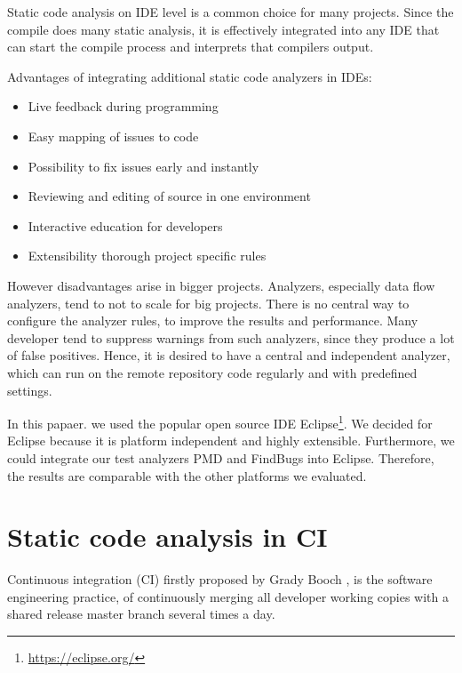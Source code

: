 \documentclass[conference]{IEEEtran}
\begin{document}
Static code analysis on IDE level is a common choice for many projects. Since the compile does many static analysis, it is effectively integrated into any IDE that can start the compile process and interprets that compilers output.

Advantages of integrating additional static code analyzers in IDEs:
\begin{itemize}
	\item Live feedback during programming
	\item Easy mapping of issues to code
	\item Possibility to fix issues early and instantly
	\item Reviewing and editing of source in one environment
	\item Interactive education for developers
	\item Extensibility thorough project specific rules
\end{itemize}

However disadvantages arise in bigger projects. Analyzers, especially data flow analyzers, tend to not to scale for big projects. 
There is no central way to configure the analyzer rules, to improve the results and performance.
Many developer tend to suppress warnings from such analyzers, since they produce a lot of false positives.
Hence, it is desired to have a central and independent analyzer, which can run on the remote repository code regularly and with predefined settings.

In this papaer. we used the popular open source IDE Eclipse\footnote{\href{https://eclipse.org/}{https://eclipse.org/}}.
We decided for Eclipse because it is platform independent and highly extensible. Furthermore, we could integrate our test analyzers PMD and FindBugs into Eclipse. Therefore, the results are comparable with the other platforms we evaluated.


\section{Static code analysis in CI}
\label{sec:static_code_analysis_ci}
Continuous integration (CI) firstly proposed by Grady Booch \cite{CI-Definition:Booch:1993}, is the software engineering practice, of continuously merging all developer working copies with a shared release master branch several times a day.
\end{document}
